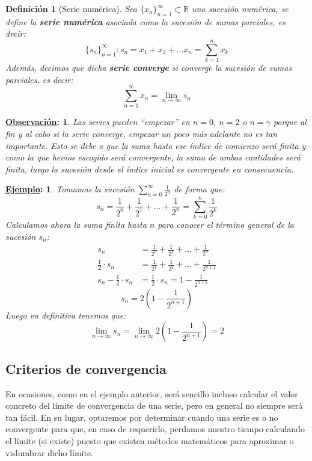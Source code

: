 \documentclass[10pt,a4paper,openright]{book}
\theoremstyle{break}
\newtheorem*{defi}{Definición}
\newtheorem*{obs}{\underline{Observación}:}
\newtheorem*{ej}{\underline{Ejemplo}:}
\begin{document}
\begin{defi}[Serie numérica]
Sea $\{x_n\}_{n=1}^\infty\subset \mathbb R$ una sucesión numérica, se define la \textbf{serie numérica} asociada como la sucesión de sumas parciales, es decir:
$$\{s_n\}_{n=1}^\infty: s_n = x_1 + x_2 + \ldots x_n = \sum_{k=1}^{n} x_k$$
Además, decimos que dicha \textbf{serie converge} si converge la sucesión de sumas parciales, es decir:
$$\sum_{n=1}^\infty x_n = \lim_{n\rightarrow\infty} s_n$$
\end{defi}

\begin{obs}
Las series pueden ``empezar'' en $n=0$, $n=2$ o $n=\gamma$ porque al fin y al cabo si la serie converge, empezar un poco más adelante no es tan importante. Esto se debe a que la suma hasta ese índice de comienzo será finita y como la que hemos escogido será convergente, la suma de ambas cantidades será finita, luego la sucesión desde el índice inicial es convergente en consecuencia.
\end{obs}

\begin{ej}
Tomamos la sucesión $ \displaystyle \sum_{n=0}^{\infty} \frac{1}{2^n}$ de forma que:
$$s_n =\frac{1}{2^0} + \frac{1}{2^1} + \ldots + \frac{1}{2^n} = \sum_{k=0}^{n} \frac{1}{2^k}$$
Calculamos ahora la suma finita hasta $n$ para conocer el término general de la sucesión $s_n$:
\begin{align*}
s_n &= \frac{1}{2^0} + \frac{1}{2^1} + \ldots + \frac{1}{2^n} \\
\frac{1}{2}\cdot s_n &= \frac{1}{2^1} + \frac{1}{2^2} + \ldots + \frac{1}{2^{n+1}} \\
s_n - \frac{1}{2}\cdot s_n &= \frac{1}{2}\cdot s_n = 1 - \frac{1}{2^{n+1}}
\end{align*}
$$s_n= 2\left(1 - \frac{1}{2^{n+1}}\right)$$
Luego en definitiva tenemos que:
$$\lim_{n \to \infty} s_n = \lim_{n \to \infty}  2\left(1 - \frac{1}{2^{n+1}}\right) = 2$$
\end{ej}

\subsection{Criterios de convergencia}
En ocasiones, como en el ejemplo anterior, será sencillo incluso calcular el valor concreto del límite de convergencia de una serie, pero en general no siempre será tan fácil. En su lugar, optaremos por determinar cuando una serie es o no convergente para que, en caso de requerirlo, perdamos nuestro tiempo calculando el límite (si existe) puesto que existen métodos matemáticos para aproximar o vislumbrar dicho límite.
\end{document}

